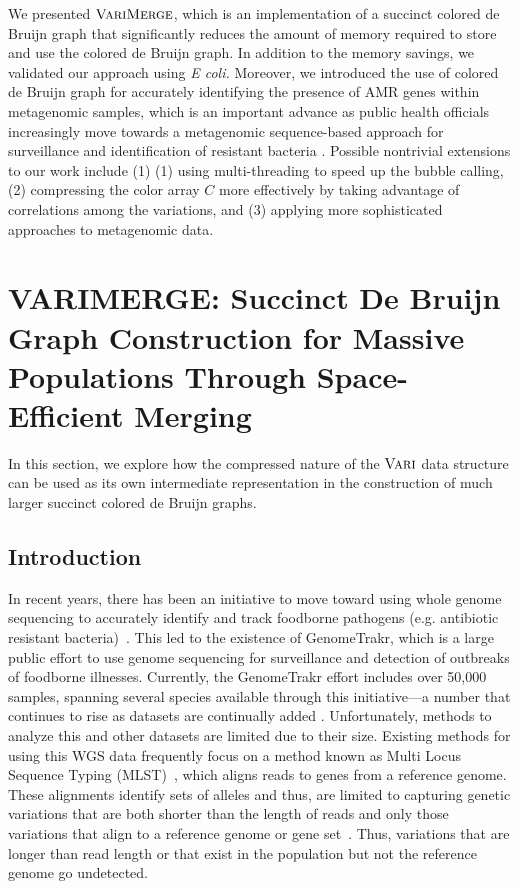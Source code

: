We presented $\mbox{\rm {\sc VariMerge}}$, which is an implementation of a succinct colored de Bruijn graph that significantly reduces the amount of memory required to store and use the colored de Bruijn graph. In addition to the memory savings, we validated our approach using \emph{E coli.} Moreover, we introduced the use of colored de Bruijn graph for accurately identifying the presence of AMR genes within metagenomic samples, which is an important advance as public health officials increasingly move towards a metagenomic sequence-based approach for surveillance and identification of resistant bacteria \cite{baquero_metagenomic_epi, port_2014_metagenomics_AMR_monitoring,FAOActionPlan2016}. Possible nontrivial extensions to our work include (1)
(1) using multi-threading to speed up the bubble calling, (2) compressing the color array $C$ more effectively by taking advantage of correlations among the variations, and (3) applying more sophisticated approaches to metagenomic data.








\section{VARIMERGE: Succinct De Bruijn Graph Construction for Massive Populations Through Space-Efficient Merging }

In this section, we explore how the compressed nature of the $\mbox{\rm {\sc Vari}}$ data structure can be used as its own intermediate representation in the construction of much larger succinct colored de Bruijn graphs.

\subsection{Introduction}


In recent years, there has been an initiative to move toward using whole genome sequencing to accurately identify and track foodborne pathogens (e.g. antibiotic resistant bacteria)~\cite{carleton2016whole}. This led to the existence of GenomeTrakr, which is a large public effort to use genome sequencing for surveillance and detection of outbreaks of foodborne illnesses. Currently, the GenomeTrakr effort includes over 50,000 samples, spanning several species available through this initiative---a number that continues to rise as datasets are continually added \cite{genometrakr}.  Unfortunately, methods to analyze this and other datasets are limited due to their size.   Existing methods for using this WGS data frequently focus on a method known as Multi Locus Sequence Typing (MLST)~\cite{pettengill2016}, which aligns reads to genes from a reference genome.  These alignments identify sets of alleles and thus, are limited to capturing genetic variations that are both shorter than the length of reads and only those variations that align to a reference genome or gene set~\cite{maiden2013mlst}.  Thus, variations that are longer than read length or that exist in the population but not the reference genome go undetected.

